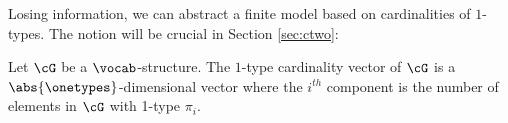 Losing information, we can abstract a finite model based on cardinalities of $1$-types. The notion will be crucial in Section \ref{sec:ctwo}:
\begin{definition} \label{def:cardboundvector}
    Let $\cG$ be a $\vocab$-structure.
    The $1$-type cardinality vector of $\cG$ is a $\abs{\onetypes}$-dimensional vector 
    where the $i^{th}$ component is the number of elements in $\cG$ with 1-type $\pi_i$.
\end{definition}

